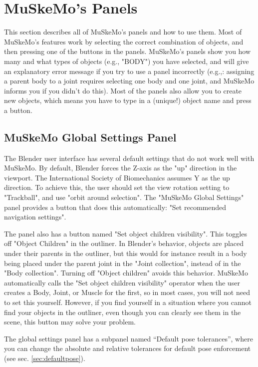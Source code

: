\documentclass{article}
\begin{document}
\section{MuSkeMo's Panels}
This section describes all of MuSkeMo's panels and how to use them. Most of MuSkeMo's features work by selecting the correct combination of objects, and then pressing one of the buttons in the panels. MuSkeMo's panels show you how many and what types of objects (e.g., "BODY") you have selected, and will give an explanatory error message if you try to use a panel incorrectly (e.g.,: assigning a parent body to a joint requires selecting one body and one joint, and MuSkeMo informs you if you didn't do this). Most of the panels also allow you to create new objects, which means you have to type in a (unique!) object name and press a button. 

\subsection{MuSkeMo Global Settings Panel}
\label{sec:MSM_glob_settings}
The Blender user interface has several default settings that do not work well with MuSkeMo. By default, Blender forces the Z-axis as the "up" direction in the viewport. The International Society of Biomechanics assumes Y as the up direction. To achieve this, the user should set the view rotation setting to "Trackball", and use "orbit around selection". The "MuSkeMo Global Settings" panel provides a button that does this automatically: "Set recommended navigation settings". 

The panel also has a button named "Set object children visibility". This toggles off "Object Children" in the outliner. In Blender's behavior, objects are placed under their parents in the outliner, but this would for instance result in a body being placed under the parent joint in the "Joint collection", instead of in the "Body collection". Turning off "Object children" avoids this behavior. MuSkeMo automatically calls the "Set object children visibility" operator when the user creates a Body, Joint, or Muscle for the first, so in most cases, you will not need to set this yourself. However, if you find yourself in a situation where you cannot find your objects in the outliner, even though you can clearly see them in the scene, this button may solve your problem.

The global settings panel has a subpanel named ``Default pose tolerances'', where you can change the absolute and relative tolerances for default pose enforcement (see sec. \ref{sec:defaultpose}).
\end{document}
